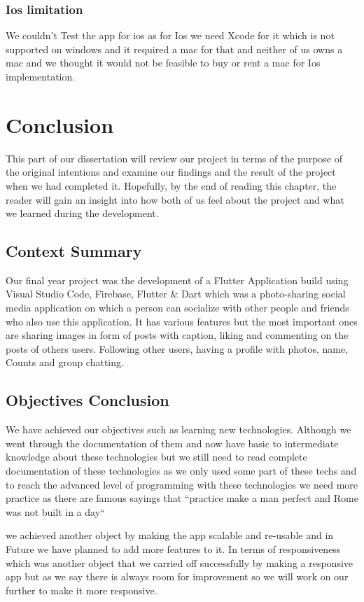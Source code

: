 \subsection{Ios limitation}
We couldn't Test the app for ios as for Ios we need Xcode for it which is not supported on windows and it required a mac for that and neither of us owns a mac and we thought it would not be feasible to buy or rent a mac for Ios implementation.

\chapter{Conclusion}

This part of our dissertation will review our project in terms of the purpose of the original intentions and examine our findings and the result of the project when we had completed it. Hopefully, by the end of reading this chapter, the reader will gain an insight into how both of us feel about the project and what we learned during the development.

\section{Context Summary}
Our final year project was the development of a Flutter Application build using Visual Studio Code, Firebase, Flutter \& Dart which was a photo-sharing social media application on which a person can socialize with other people and friends who also use this application. It has various features but the most important ones are sharing images in form of posts with caption, liking and commenting on the posts of others users. Following other users, having a profile with photos, name, Counts and group chatting.
\section{Objectives Conclusion}
We have achieved our objectives such as learning new technologies. Although we went through the documentation of them and now have basic to intermediate knowledge about these technologies but we still need to read complete documentation of these technologies as we only used some part of these techs and to reach the advanced level of programming with these technologies we need more practice as there are famous sayings that ``practice make a man perfect and Rome was not built in a day``

we achieved another object by making the app scalable and re-usable and in Future we have planned to add more features to it. In terms of responsiveness which was another object that we carried off successfully by making a responsive app but as we say there is always room for improvement so we will work on our further to make it more responsive.

